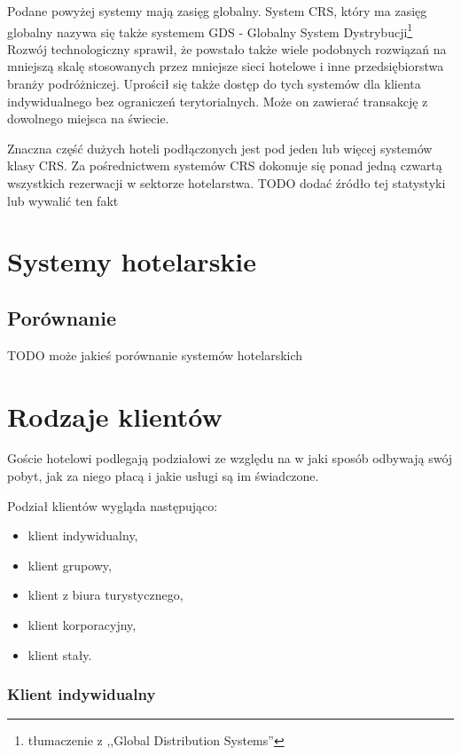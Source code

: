 \documentclass[a4paper,onecolumn,oneside,11pt,wide,floatssmall]{mwrep}
\theoremstyle{definition}
\theoremstyle{plain}%
\theoremstyle{remark}
\begin{document}
Podane powyżej systemy mają zasięg globalny. System CRS, który ma zasięg 
globalny nazywa się także systemem GDS - Globalny System Dystrybucji\footnote
{tłumaczenie z ,,Global Distribution Systems''} Rozwój technologiczny 
sprawił, że powstało także wiele podobnych rozwiązań na mniejszą skalę 
stosowanych przez mniejsze sieci hotelowe i inne przedsiębiorstwa branży 
podróżniczej. Uprościł się także dostęp do tych systemów dla klienta 
indywidualnego bez ograniczeń terytorialnych. Może on zawierać transakcję z 
dowolnego miejsca na świecie.

Znaczna część dużych hoteli podłączonych jest pod jeden lub więcej systemów 
klasy CRS.
Za pośrednictwem systemów CRS dokonuje się ponad jedną czwartą wszystkich 
rezerwacji w sektorze hotelarstwa.
TODO dodać źródło tej statystyki lub wywalić ten fakt

\section{Systemy hotelarskie}

\subsection{Porównanie}
TODO może jakieś porównanie systemów hotelarskich

\section{Rodzaje klientów}
\label{rodzaje-klientow}
Goście hotelowi podlegają podziałowi ze względu na w jaki sposób odbywają 
swój pobyt, jak za niego płacą i jakie usługi są im świadczone.

Podział klientów wygląda następująco:

\begin{itemize}
  \item klient indywidualny,
  \item klient grupowy,
  \item klient z biura turystycznego,
  \item klient korporacyjny,
  \item klient stały.
\end{itemize}

\subsubsection{Klient indywidualny}
\end{document}
